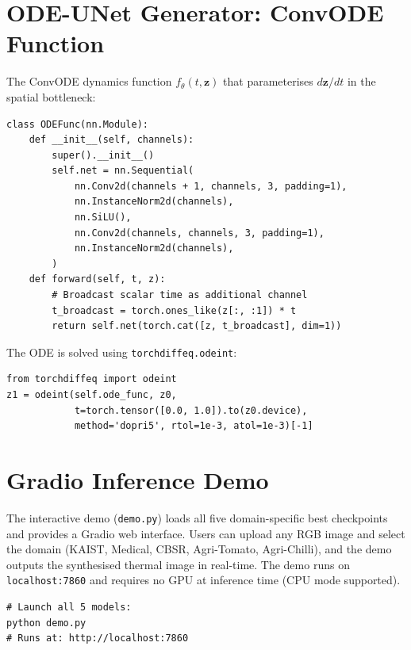 \section{ODE-UNet Generator: ConvODE Function}

The ConvODE dynamics function $f_\theta(t, \mathbf{z})$ that parameterises $d\mathbf{z}/dt$ in the spatial bottleneck:

\begin{verbatim}
class ODEFunc(nn.Module):
    def __init__(self, channels):
        super().__init__()
        self.net = nn.Sequential(
            nn.Conv2d(channels + 1, channels, 3, padding=1),
            nn.InstanceNorm2d(channels),
            nn.SiLU(),
            nn.Conv2d(channels, channels, 3, padding=1),
            nn.InstanceNorm2d(channels),
        )
    def forward(self, t, z):
        # Broadcast scalar time as additional channel
        t_broadcast = torch.ones_like(z[:, :1]) * t
        return self.net(torch.cat([z, t_broadcast], dim=1))
\end{verbatim}

The ODE is solved using \texttt{torchdiffeq.odeint}:

\begin{verbatim}
from torchdiffeq import odeint
z1 = odeint(self.ode_func, z0,
            t=torch.tensor([0.0, 1.0]).to(z0.device),
            method='dopri5', rtol=1e-3, atol=1e-3)[-1]
\end{verbatim}

\section{Gradio Inference Demo}

The interactive demo (\texttt{demo.py}) loads all five domain-specific best checkpoints and provides a Gradio web interface. Users can upload any RGB image and select the domain (KAIST, Medical, CBSR, Agri-Tomato, Agri-Chilli), and the demo outputs the synthesised thermal image in real-time. The demo runs on \texttt{localhost:7860} and requires no GPU at inference time (CPU mode supported).

\begin{verbatim}
# Launch all 5 models:
python demo.py
# Runs at: http://localhost:7860
\end{verbatim}
